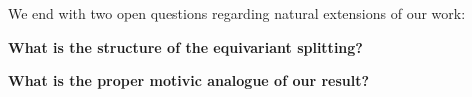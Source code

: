 We end with two open questions regarding natural extensions of our work:

\textbf{What is the structure of the equivariant splitting?}

\textbf{What is the proper motivic analogue of our result?}





